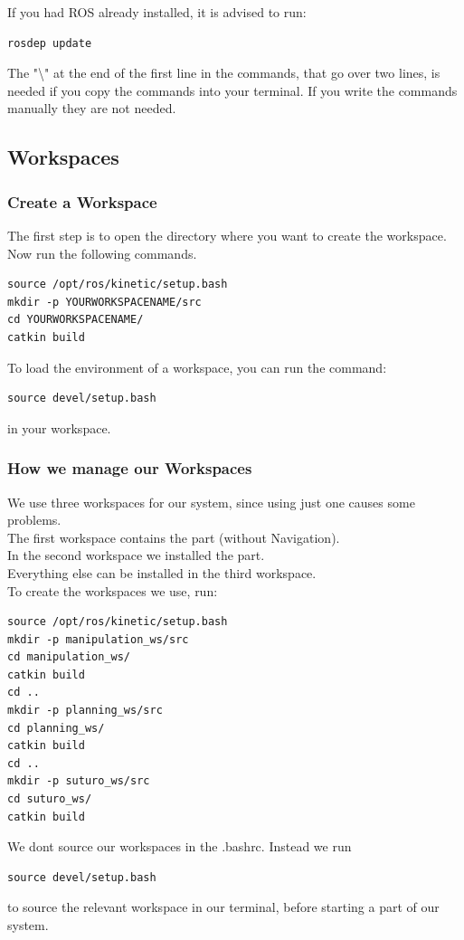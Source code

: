 \documentclass[main.tex]{subfiles}
\begin{document}
If you had ROS already installed, it is advised to run:
\begin{lstlisting}
rosdep update
\end{lstlisting}
The "\textbackslash" at the end of the first line in the commands, that go over two lines, is needed if you copy the commands into your terminal. If you write the commands manually they are not needed.
	
	\subsection{Workspaces}
	\subsubsection{Create a Workspace}
	The first step is to open the directory where you want to create the workspace.\\
	Now run the following commands.
	\begin{lstlisting}
source /opt/ros/kinetic/setup.bash
mkdir -p YOURWORKSPACENAME/src
cd YOURWORKSPACENAME/
catkin build 
\end{lstlisting}
	
	To load the environment of a workspace, you can run the command:
	\begin{lstlisting}
source devel/setup.bash
\end{lstlisting}
	in your workspace.
	
	\subsubsection{How we manage our Workspaces} \label{workspace_management}
	
	We use three workspaces for our system, since using just one causes some problems.\\
	The first workspace contains the  part (without Navigation).\\
	In the second workspace we installed the  part.\\
	Everything else can be installed in the third workspace.\\
	To create the workspaces we use, run:
	\begin{lstlisting}
source /opt/ros/kinetic/setup.bash
mkdir -p manipulation_ws/src
cd manipulation_ws/
catkin build 
cd ..
mkdir -p planning_ws/src
cd planning_ws/
catkin build 
cd ..
mkdir -p suturo_ws/src
cd suturo_ws/
catkin build 
\end{lstlisting}
	
	We dont source our workspaces in the .bashrc. Instead we run
	\begin{lstlisting}
source devel/setup.bash
\end{lstlisting}
to source the relevant workspace in our terminal, before starting a part of our system.
	
\end{document}
